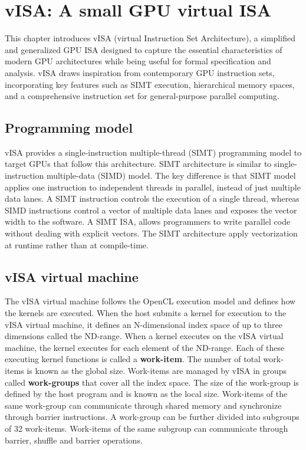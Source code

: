 %

\chapter{vISA: A small GPU virtual ISA}

This chapter introduces vISA (virtual Instruction Set Architecture), a
simplified and generalized GPU ISA designed to capture the essential
characteristics of modern GPU architectures while being useful for formal
specification and analysis. vISA draws inspiration from contemporary GPU
instruction sets, incorporating key features such as SIMT execution,
hierarchical memory spaces, and a comprehensive instruction set for
general-purpose parallel computing.

\section{Programming model}

vISA provides a single-instruction multiple-thread (SIMT) programming model to
target GPUs that follow this architecture. SIMT architecture is similar to
single-instruction multiple-data (SIMD) model. The key difference is that SIMT
model applies one instruction to independent threads in parallel, instead of
just multiple data lanes. A SIMT instruction controls the execution of a single
thread, whereas SIMD instructions control a vector of multiple data lanes and
exposes the vector width to the software. A SIMT ISA, allows programmers to
write parallel code without dealing with explicit vectors. The SIMT
architecture apply vectorization at runtime rather than at compile-time.

\section{vISA virtual machine}

The vISA virtual machine follows the OpenCL execution model and defines how the
kernels are executed. When the host submits a kernel for execution to the vISA
virtual machine, it defines an N-dimensional index space of up to three
dimensions called the ND-range. When a kernel executes on the vISA virtual
machine, the kernel executes for each element of the ND-range. Each of these
executing kernel functions is called a \textbf{work-item}. The number of total
work-items is known as the global size. Work-items are managed by vISA in
groups called \textbf{work-groups} that cover all the index space. The size of
the work-group is defined by the host program and is known as the local size.
Work-items of the same work-group can communicate through shared memory and
synchronize through barrier instructions. A work-group can be further divided
into subgroups of 32 work-items. Work-items of the same subgroup can
communicate through barrier, shuffle and barrier operations.

